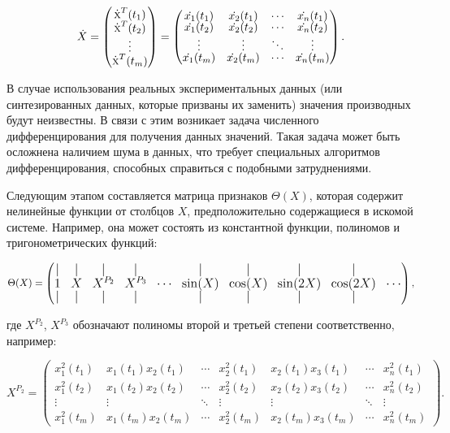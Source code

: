 \begin{equation}
\dot{X} = 
\begin{pmatrix}
\dot{\textsc{x}}^T(t_1) \\	
\dot{\textsc{x}}^T(t_2) \\
\vdots \\	
\dot{\textsc{x}}^T(t_m)	
\end{pmatrix}
=
\begin{pmatrix}
\dot{x_1}(t_1) & \dot{x_2}(t_1) & \cdots & \dot{x_n}(t_1) \\
\dot{x_1}(t_2) & \dot{x_2}(t_2) & \cdots & \dot{x_n}(t_2) \\
\vdots & \vdots & \ddots & \vdots \\
\dot{x_1}(t_m) & \dot{x_2}(t_m) & \cdots & \dot{x_n}(t_m)
\end{pmatrix}.
\end{equation}

В случае использования реальных экспериментальных данных (или синтезированных данных, которые призваны их заменить) значения производных будут неизвестны. В связи с этим возникает задача численного дифференцирования для получения данных значений. Такая задача может быть осложнена наличием шума в данных, что требует специальных алгоритмов дифференцирования, способных справиться с подобными затруднениями.

Следующим этапом составляется матрица признаков $\Theta(X)$, которая содержит нелинейные функции от столбцов $X$, предположительно содержащиеся в искомой системе. Например, она может состоять из константной функции, полиномов и тригонометрических функций:

\begin{equation}
\fontsize{13pt}{15pt}\selectfont
\renewcommand*{\arraystretch}{.5}
\Theta(X) = 
\begin{pmatrix}
| & | & | & | &  & | & | & | & | &  \\
1 & X & X^{P_2} & X^{P_3} & \cdots & \sin(X) & \cos(X) & \sin(2X) & \cos(2X) & \cdots \\
| & | & | & | &  & | & | & | & | & 
\end{pmatrix},
\end{equation}

где $X^{P_2}$, $X^{P_3}$ обозначают полиномы второй и третьей степени соответственно, например:

\begin{equation}
X^{P_2} = 
\begin{pmatrix}
x_1^2(t_1) & x_1(t_1) x_2(t_1) & \cdots & x_2^2(t_1) & x_2(t_1) x_3(t_1) & \cdots & x_n^2(t_1) \\ 
x_1^2(t_2) & x_1(t_2) x_2(t_2) & \cdots & x_2^2(t_2) & x_2(t_2) x_3(t_2) & \cdots & x_n^2(t_2) \\
\vdots & \vdots & \ddots & \vdots & \vdots & \ddots & \vdots \\
x_1^2(t_m) & x_1(t_m) x_2(t_m) & \cdots & x_2^2(t_m) & x_2(t_m) x_3(t_m) & \cdots & x_n^2(t_m)
\end{pmatrix}.
\end{equation}

